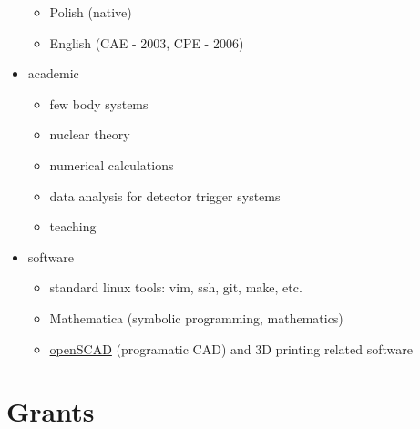 \begin{itemize}
  \begin{itemize}
  \tightlist
  \item
    Polish (native)
  \item
    English (CAE - 2003, CPE - 2006)
  \end{itemize}
\item
  academic

  \begin{itemize}
  \tightlist
  \item
    few body systems
  \item
    nuclear theory
  \item
    numerical calculations
  \item
    data analysis for detector trigger systems
  \item
    teaching
  \end{itemize}
\item
  software

  \begin{itemize}
  \tightlist
  \item
    standard linux tools: vim, ssh, git, make, etc.
  \item
    Mathematica (symbolic programming, mathematics)
  \item
    \href{https://openscad.org/}{openSCAD} (programatic CAD) and 3D
    printing related software
  \end{itemize}
\end{itemize}

\hypertarget{grants}{%
\section{Grants}\label{grants}}

